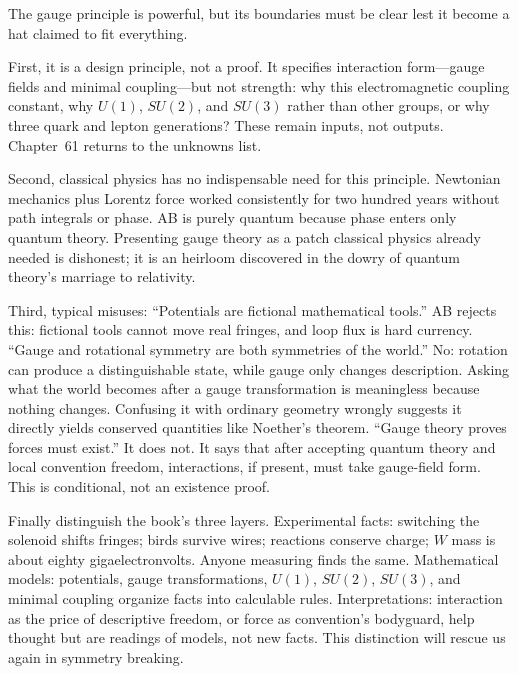 \begin{mainline}
The gauge principle is powerful, but its boundaries must be clear lest it become a hat claimed to fit everything.

First, it is a design principle, not a proof. It specifies interaction form---gauge fields and minimal coupling---but not strength: why this electromagnetic coupling constant, why \(U(1)\), \(SU(2)\), and \(SU(3)\) rather than other groups, or why three quark and lepton generations? These remain inputs, not outputs. Chapter~61 returns to the unknowns list.

Second, classical physics has no indispensable need for this principle. Newtonian mechanics plus Lorentz force worked consistently for two hundred years without path integrals or phase. AB is purely quantum because phase enters only quantum theory. Presenting gauge theory as a patch classical physics already needed is dishonest; it is an heirloom discovered in the dowry of quantum theory's marriage to relativity.

Third, typical misuses: ``Potentials are fictional mathematical tools.'' AB rejects this: fictional tools cannot move real fringes, and loop flux is hard currency. ``Gauge and rotational symmetry are both symmetries of the world.'' No: rotation can produce a distinguishable state, while gauge only changes description. Asking what the world becomes after a gauge transformation is meaningless because nothing changes. Confusing it with ordinary geometry wrongly suggests it directly yields conserved quantities like Noether's theorem. ``Gauge theory proves forces must exist.'' It does not. It says that after accepting quantum theory and local convention freedom, interactions, if present, must take gauge-field form. This is conditional, not an existence proof.

Finally distinguish the book's three layers. Experimental facts: switching the solenoid shifts fringes; birds survive wires; reactions conserve charge; \(W\) mass is about eighty gigaelectronvolts. Anyone measuring finds the same. Mathematical models: potentials, gauge transformations, \(U(1)\), \(SU(2)\), \(SU(3)\), and minimal coupling organize facts into calculable rules. Interpretations: interaction as the price of descriptive freedom, or force as convention's bodyguard, help thought but are readings of models, not new facts. This distinction will rescue us again in symmetry breaking.
\end{mainline}


